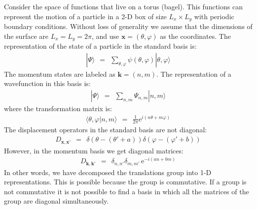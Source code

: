 \documentclass[onecolumn,fleqn, 11pt]{revtex4}
\newcommand{\eexp}{\mathrm{e}^}
\newcommand{\beq}{\begin{eqnarray}}
\newcommand{\eeq}{\end{eqnarray}}
\begin{document}
Consider the space of functions that live on a torus (bagel).
This functions can represent the motion  
of a particle in a 2-D box of size ${L_x \times L_y}$  
with periodic boundary conditions. 
Without loss of generality we assume that 
the dimensions of the surface are ${L_x=L_y=2\pi}$, 
and use ${\bm{x}=(\theta,\varphi)}$ as the coordinates.  
The representation of the state of a particle 
in the standard basis is:
\beq
|\Psi \rangle \ \ = \ \ \sum_{\theta,\varphi} \psi(\theta,\varphi) |\theta,\varphi\rangle 
\eeq
The momentum states are labeled as $\bm{k}=(n,m)$. 
The representation of a wavefunction in this basis is:
\beq
|\Psi \rangle \ \ = \ \ \sum_{n,m} \Psi_{n,m} |n,m\rangle 
\eeq
where the transformation matrix is:
\beq
\langle \theta,\varphi |n,m\rangle \ \ = \ \ \frac{1}{2\pi}\eexp{i (n\theta  + m \varphi)} 
\eeq
The displacement operators in the standard basis are not diagonal:
\beq
D_{\bm{x},\bm{x}'} \ \ = \ \ 
\delta (\theta-(\theta'+a))\delta(\varphi-(\varphi'+b)) 
\eeq
However, in the momentum basis we get diagonal matrices:
\beq
D_{\bm{k},\bm{k}'} \ \ = \ \  
\delta_{n,n'} \delta_{m,m'} \, \eexp{-i(a n + b m)} 
\eeq
In other words, we have decomposed the translations 
group into 1-D representations. This is possible 
because the group is commutative. If a group is 
not commutative it is not possible to find a basis 
in which all the matrices of the group are diagonal 
simultaneously. 
\end{document}
